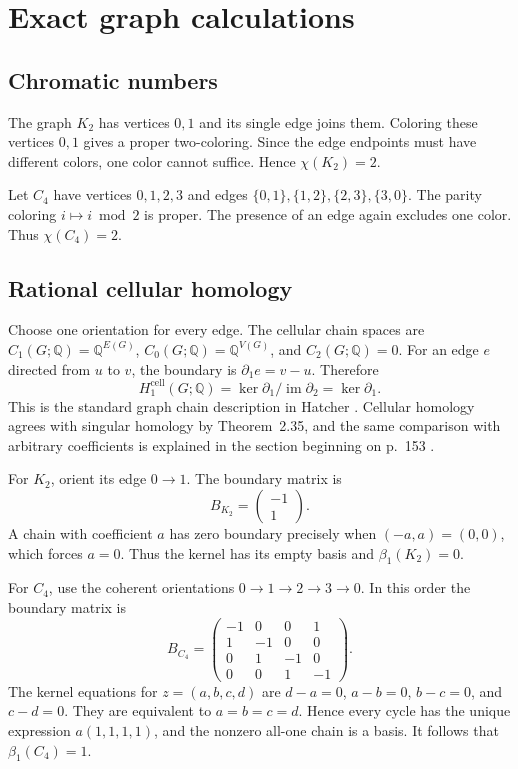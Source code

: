 \documentclass[11pt]{article}
\newcommand{\Q}{\mathbb{Q}}
\begin{document}
\section{Exact graph calculations}
\subsection{Chromatic numbers}
The graph $K_2$ has vertices $0,1$ and its single edge joins them. Coloring
these vertices $0,1$ gives a proper two-coloring. Since the edge endpoints
must have different colors, one color cannot suffice. Hence $\chi(K_2)=2$.

Let $C_4$ have vertices $0,1,2,3$ and edges
$\{0,1\},\{1,2\},\{2,3\},\{3,0\}$.
The parity coloring $i\mapsto i\bmod 2$ is proper. The presence of an edge
again excludes one color. Thus $\chi(C_4)=2$.

\subsection{Rational cellular homology}
Choose one orientation for every edge. The cellular chain spaces are
$C_1(G;\Q)=\Q^{E(G)}$, $C_0(G;\Q)=\Q^{V(G)}$, and $C_2(G;\Q)=0$.
For an edge $e$ directed from $u$ to $v$, the boundary is
$\partial_1e=v-u$. Therefore
\[
 H_1^{\mathrm{cell}}(G;\Q)
 =\ker\partial_1/\operatorname{im}\partial_2
 =\ker\partial_1.
\]
This is the standard graph chain description in Hatcher
\cite[pp.~99--101]{hatcher}. Cellular homology agrees with singular homology
by Theorem~2.35, and the same comparison with arbitrary coefficients is
explained in the section beginning on p.~153 \cite{hatcher}.

For $K_2$, orient its edge $0\to1$. The boundary matrix is
\[
 B_{K_2}=\begin{pmatrix}-1\\1\end{pmatrix}.
\]
A chain with coefficient $a$ has zero boundary precisely when
$(-a,a)=(0,0)$, which forces $a=0$.
Thus the kernel has its empty basis and $\beta_1(K_2)=0$.

For $C_4$, use the coherent orientations
$0\to1\to2\to3\to0$. In this order the boundary matrix is
\[
 B_{C_4}=\begin{pmatrix}
 -1&0&0&1\\
 1&-1&0&0\\
 0&1&-1&0\\
 0&0&1&-1
 \end{pmatrix}.
\]
The kernel equations for $z=(a,b,c,d)$ are
$d-a=0$, $a-b=0$, $b-c=0$, and $c-d=0$.
They are equivalent to $a=b=c=d$.
Hence every cycle has the unique expression
$a(1,1,1,1)$, and the nonzero all-one chain is a basis.
It follows that $\beta_1(C_4)=1$.
\end{document}
